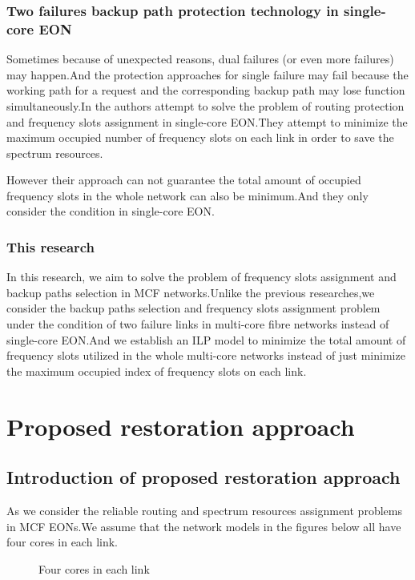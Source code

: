 \documentclass[a4paper,11pt]{report}
\begin{document}
\subsection{Two failures backup path protection technology in single-core EON}
Sometimes because of unexpected reasons, dual failures (or even more failures) may happen.And the protection approaches for single failure may fail because the working path for a request and the corresponding backup path may lose function simultaneously.In \cite{Hong Guo2016} the authors attempt to solve the problem of routing protection and frequency slots assignment in single-core EON.They attempt to minimize the maximum occupied number of frequency slots on each link in order to save the spectrum resources.\par
However their approach can not guarantee the total amount of occupied frequency slots in the whole network can also be minimum.And they only consider the condition in single-core EON.\par

\subsection{This research}
In this research, we aim to solve the problem of frequency slots assignment and backup paths selection in MCF networks.Unlike the previous researches\cite{Hong Guo2016}\cite{shen2014},we consider the backup paths selection and frequency slots assignment problem under the condition of two failure links in multi-core fibre networks instead of single-core EON.And we establish an ILP model to minimize the total amount of frequency slots utilized in the whole multi-core networks instead of just minimize the maximum occupied index of frequency slots on each link.
 

\chapter{Proposed restoration approach}
\section{Introduction of proposed restoration approach}
As we consider the reliable routing and spectrum resources assignment problems in MCF EONs.We assume that the network models in the figures below all have four cores in each link.
        \begin{figure}[htbp]
        \begin{center}
        \end{center}
        \caption{Four cores in each link}
        \label{figure:Four cores}
        \end{figure}
    
\end{document}
